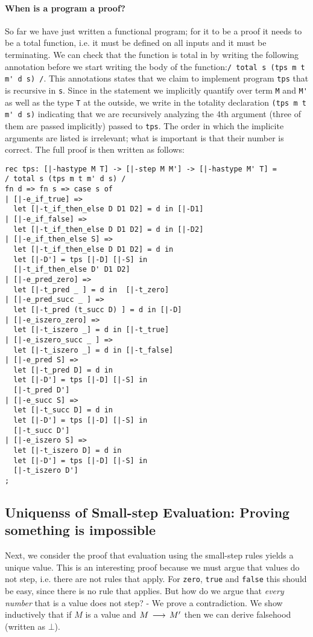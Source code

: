 \paragraph{When is a program a proof?} So far we have just written a
functional program; for it to be a proof it needs to be a total
function, i.e. it must be defined on all inputs and it must be
terminating. We can check that the function is total in \beluga by
writing the following annotation before we start writing the body of
the function:\lstinline!/ total s (tps m t m' d s) /!. This
annotations states that we claim to implement program \lstinline!tps! that is
recursive in \lstinline!s!. Since in the statement we implicitly
quantify over term \lstinline!M! and \lstinline!M'! as well as the
type \lstinline!T! at the outside, we write in the totality
declaration \lstinline!(tps m t m' d s)! indicating that we are
recursively analyzing the 4th argument (three of them are passed
implicitly) passed to \lstinline!tps!. The order in which the
implicite arguments are listed is irrelevant; what is important is
that their number is correct.
The full proof is then written as follows:


\begin{lstlisting}
rec tps: [|-hastype M T] -> [|-step M M'] -> [|-hastype M' T] =
/ total s (tps m t m' d s) /
fn d => fn s => case s of
| [|-e_if_true] =>
  let [|-t_if_then_else D D1 D2] = d in [|-D1]
| [|-e_if_false] =>
  let [|-t_if_then_else D D1 D2] = d in [|-D2]
| [|-e_if_then_else S] =>
  let [|-t_if_then_else D D1 D2] = d in
  let [|-D'] = tps [|-D] [|-S] in
  [|-t_if_then_else D' D1 D2]
| [|-e_pred_zero] =>
  let [|-t_pred _ ] = d in  [|-t_zero]
| [|-e_pred_succ _ ] =>
  let [|-t_pred (t_succ D) ] = d in [|-D]
| [|-e_iszero_zero] =>
  let [|-t_iszero _] = d in [|-t_true]
| [|-e_iszero_succ _ ] =>
  let [|-t_iszero _] = d in [|-t_false]
| [|-e_pred S] =>
  let [|-t_pred D] = d in
  let [|-D'] = tps [|-D] [|-S] in
  [|-t_pred D']
| [|-e_succ S] =>
  let [|-t_succ D] = d in
  let [|-D'] = tps [|-D] [|-S] in
  [|-t_succ D']
| [|-e_iszero S] =>
  let [|-t_iszero D] = d in
  let [|-D'] = tps [|-D] [|-S] in
  [|-t_iszero D']
;
\end{lstlisting}


\subsection{Uniquenss of Small-step Evaluation: Proving something is impossible}
Next, we consider the proof that evaluation using the small-step rules yields a
unique value. This is an interesting proof because we must argue that values do
not step, i.e. there are not rules that apply. For \lstinline!zero!,
\lstinline!true! and \lstinline!false! this should be easy, since there is no
rule that applies. But how do we argue that \emph{every number} that is a value
does not step? - We prove a contradiction. We show inductively that if $M$ is a
value and $M \mathrel{\,\longrightarrow\,} M'$ then we can derive falsehood (written as $\bot$).

